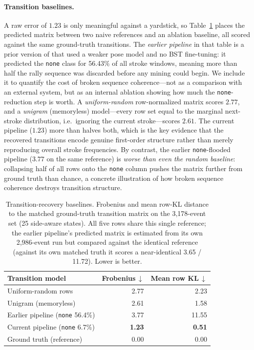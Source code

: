 \paragraph{Transition baselines.}
A raw error of $1.23$ is only meaningful against a yardstick, so
Table~\ref{tab:transition_baselines} places the predicted matrix between two
naive references and an ablation baseline, all scored against the same
ground-truth transitions. The \emph{earlier pipeline} in that table is a prior
version of \method{} that used a weaker pose model and no BST fine-tuning: it
predicted the \texttt{none} class for 56.43\% of all stroke windows, meaning
more than half the rally sequence was discarded before any mining could begin.
We include it to quantify the cost of broken sequence coherence---not as a
comparison with an external system, but as an internal ablation showing how much
the \texttt{none}-reduction step is worth. A \emph{uniform-random} row-normalized matrix scores
$2.77$, and a \emph{unigram} (memoryless) model---every row set equal to the
marginal next-stroke distribution, i.e.\ ignoring the current stroke---scores
$2.61$. The current pipeline ($1.23$) more than halves both, which is the key
evidence that the recovered transitions encode genuine first-order structure
rather than merely reproducing overall stroke frequencies. By contrast, the
earlier \texttt{none}-flooded pipeline ($3.77$ on the same reference) is
\emph{worse than even the random baseline}: collapsing half of all rows onto the
\texttt{none} column
pushes the matrix further from ground truth than chance, a concrete illustration
of how broken sequence coherence destroys transition structure.

\begin{table}[t]
  \caption{Transition-recovery baselines. Frobenius and mean row-KL distance to
  the matched ground-truth transition matrix on the 3{,}178-event set (25
  side-aware states). All five rows share this single reference; the earlier
  pipeline's predicted matrix is estimated from its own 2{,}986-event run but
  compared against the identical reference (against its own matched truth it
  scores a near-identical 3.65 / 11.72). Lower is better.}
  \label{tab:transition_baselines}
  \centering
  \small
  \begin{tabular}{lrr}
    \toprule
    Transition model & Frobenius\,$\downarrow$ & Mean row KL\,$\downarrow$ \\
    \midrule
    Uniform-random rows              & 2.77 & 2.23 \\
    Unigram (memoryless)             & 2.61 & 1.58 \\
    Earlier pipeline (\texttt{none} 56.4\%) & 3.77 & 11.55 \\
    Current pipeline (\texttt{none} 6.7\%)  & \textbf{1.23} & \textbf{0.51} \\
    Ground truth (reference)         & 0.00 & 0.00 \\
    \bottomrule
  \end{tabular}
\end{table}

